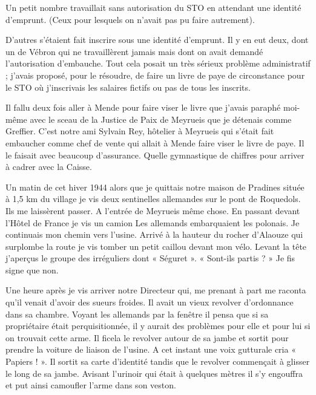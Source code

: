 
Un petit nombre travaillait sans autorisation du STO en attendant une identité d’emprunt.
(Ceux pour lesquels on n’avait pas pu faire autrement).

\vspace{0.45cm}

D’autres s’étaient fait inscrire sous une identité d’emprunt. Il y en eut deux, dont un de
Vébron qui ne travaillèrent jamais mais dont on avait demandé l’autorisation d’embauche.
Tout cela posait un très sérieux problème administratif ; j’avais proposé, pour le résoudre, de
faire un livre de paye de circonstance pour le STO où j’inscrivais les salaires fictifs ou pas de
tous les inscrits.

\vspace{0.45cm}

Il fallu deux fois aller à Mende pour faire viser le livre que j’avais paraphé moi-même avec le
sceau de la Justice de Paix de Meyrueis que je détenais comme Greffier. C’est notre ami
Sylvain Rey, hôtelier à Meyrueis qui s’était fait embaucher comme chef de vente qui allait à
Mende faire viser le livre de paye. Il le faisait avec beaucoup d’assurance. Quelle
gymnastique de chiffres pour arriver à cadrer avec la Caisse.

\vspace{0.45cm}

Un matin de cet hiver 1944 alors que je quittais notre maison de Pradines située à 1,5 km du
village je vis deux sentinelles allemandes sur le pont de Roquedols. Ils me laissèrent passer. A
l’entrée de Meyrueis même chose. En passant devant l’Hôtel de France je vis un camion Les
allemands embarquaient les polonais. Je continuais mon chemin vers l’usine. Arrivé à la
hauteur du rocher d’Alaouze qui surplombe la route je vis tomber un petit caillou devant mon
vélo. Levant la tête j’aperçus le groupe des irréguliers dont « Séguret ». « Sont-ils partis ? »
Je fis signe que non.

\vspace{0.45cm}

Une heure après je vis arriver notre Directeur qui, me prenant à part me raconta qu’il venait
d’avoir des sueurs froides. Il avait un vieux revolver d’ordonnance dans sa chambre. Voyant
les allemands par la fenêtre il pensa que si sa propriétaire était perquisitionnée, il y aurait des
problèmes pour elle et pour lui si on trouvait cette arme. Il ficela le revolver autour de sa
jambe et sortit pour prendre la voiture de liaison de l’usine. A cet instant une voix gutturale
cria « Papiers ! ». Il sortit sa carte d’identité tandis que le revolver commençait à glisser le
long de sa jambe. Avisant l’urinoir qui était à quelques mètres il s’y engouffra et put ainsi
camoufler l’arme dans son veston.

